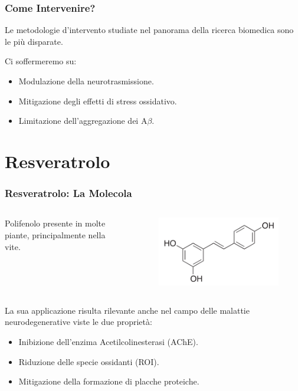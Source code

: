 \documentclass[9pt]{beamer}
\begin{document}
\begin{frame}
	\frametitle{Come Intervenire?}
	Le metodologie d'intervento studiate nel panorama della ricerca biomedica sono le più disparate.

	Ci soffermeremo su:
	\begin{itemize}
		\item Modulazione della neurotrasmissione.
		\item Mitigazione degli effetti di stress ossidativo.
		\item Limitazione dell'aggregazione dei A$\beta$.
	\end{itemize}



\end{frame}
\section{Resveratrolo}

\begin{frame}
	\frametitle{Resveratrolo: La Molecola}
	\begin{columns}
		\begin{column}{0.5\textwidth}
			Polifenolo presente in molte piante, principalmente nella vite.
		\end{column}
		\begin{column}{0.5\textwidth}
			\begin{figure}
				\includegraphics[width=.8\textwidth]{immagini/resveratrolo.png}
			\end{figure}
		\end{column}
	\end{columns}
	\medskip
	La sua applicazione risulta rilevante anche nel campo delle malattie neurodegenerative viste le due proprietà:
	\begin{itemize}
		\item Inibizione dell'enzima Acetilcolinesterasi (AChE).
		\item Riduzione delle specie ossidanti (ROI).
		\item Mitigazione della formazione di placche proteiche.
	\end{itemize}
\end{frame}
\end{document}
